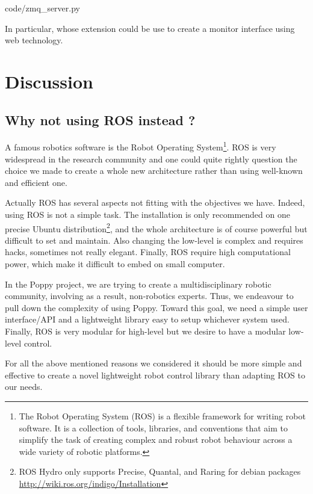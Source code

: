 
    {code/zmq_server.py}


In particular, whose extension could be use to create a monitor interface using web technology.



\section{Discussion} %

\subsection{Why not using ROS instead ?} %

A famous robotics software is the Robot Operating System\footnote{The Robot Operating System (ROS) is a flexible framework for writing robot software. It is a collection of tools, libraries, and conventions that aim to simplify the task of creating complex and robust robot behaviour across a wide variety of robotic platforms.}. ROS is very widespread in the research community and one could quite rightly question the choice we made to create a whole new architecture rather than using well-known and efficient one.

Actually ROS has several aspects not fitting with the objectives we have. Indeed, using ROS is not a simple task. The installation is only recommended on one precise Ubuntu distribution\footnote{ROS Hydro only supports Precise, Quantal, and Raring for debian packages \url{http://wiki.ros.org/indigo/Installation}}, and the whole architecture is of course powerful but difficult to set and maintain. Also changing the low-level is complex and requires hacks, sometimes not really elegant. Finally, ROS require high computational power, which make it difficult to embed on small computer.

In the Poppy project, we are trying to create a multidisciplinary robotic community, involving as a result, non-robotics experts. Thus, we endeavour to pull down the complexity of using Poppy. Toward this goal, we need a simple user interface/API and a lightweight library easy to setup whichever system used. Finally, ROS is very modular for high-level but we desire to have a modular low-level control.

For all the above mentioned reasons we considered it should be more simple and effective to create a novel lightweight robot control library than adapting ROS to our needs.


